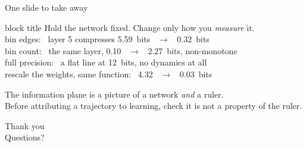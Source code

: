 \documentclass[aspectratio=169,11pt]{beamer}
\begin{document}
\begin{frame}{One slide to take away}
\begin{beamercolorbox}[sep=8pt,center,rounded=true,shadow=true]{block title}
\large
Hold the network fixed. Change only how you \emph{measure} it.\\[4pt]
\normalsize
bin edges: \ layer 5 compresses \SI{5.59}{bits} \ $\longrightarrow$ \ \SI{0.32}{bits}\\
bin count: \ the same layer, \SI{0.10}{} \ $\longrightarrow$ \ \SI{2.27}{bits}, non-monotone\\
full precision: \ a flat line at \SI{12}{bits}, no dynamics at all\\
rescale the weights, same function: \ \SI{4.32}{} \ $\longrightarrow$ \ \SI{0.03}{bits}
\end{beamercolorbox}
\bigskip
\begin{center}
\large
The information plane is a picture of a network \emph{and} a ruler.\\[3pt]
\normalsize
Before attributing a trajectory to learning, check it is not a property of the ruler.
\end{center}
\end{frame}

\begin{frame}[plain]
\begin{center}
\Huge Thank you\\[10pt]
\normalsize Questions?
\end{center}
\end{frame}
\end{document}
